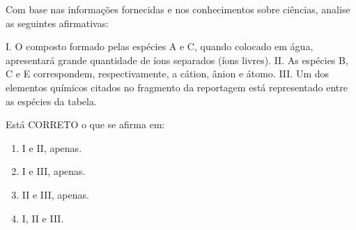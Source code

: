 \par

Com base nas informações fornecidas e nos conhecimentos sobre ciências, analise as seguintes afirmativas:

\par

I.   O composto formado pelas espécies A e C, quando colocado em água, apresentará grande quantidade de íons separados (íons livres). II. As espécies B, C e E correspondem, respectivamente, a cátion, ânion e átomo. III. Um dos elementos químicos citados no fragmento da reportagem está representado entre as espécies da tabela.

\par

Está CORRETO o que se afirma em:\begin{enumerate}
\item I e II, apenas.
\item I e III, apenas.
\item II e III, apenas.
\item I, II e III.\end{enumerate}
